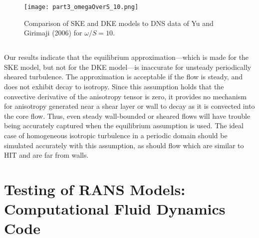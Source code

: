 \documentclass[11pt]{article}
\begin{document}
\begin{figure}[p]
\centering
\texttt{[image: part3\_omegaOverS\_10.png]}
\vspace{6pt}
\caption{Comparison of SKE and DKE models to DNS data of Yu and Girimaji (2006) for $\omega/S=10$.}
\label{fig:part3_omegaOverS_10}
\end{figure}

\subsection{}

Our results indicate that the equilibrium approximation---which is made for the SKE model, but not for the DKE model---is inaccurate for unsteady periodically sheared turbulence. The approximation is acceptable if the flow is steady, and does not exhibit decay to isotropy. Since this assumption holds that the convective derivative of the anisotropy tensor is zero, it provides no mechanism for anisotropy generated near a shear layer or wall to decay as it is convected into the core flow. Thus, even steady wall-bounded or sheared flows will have trouble being accurately captured when the equilibrium assumption is used. The ideal case of homogeneous isotropic turbulence in a periodic domain should be simulated accurately with this assumption, as should flow which are similar to HIT and are far from walls.



\section{Testing of RANS Models: Computational Fluid Dynamics Code}

\subsection{}

\end{document}
